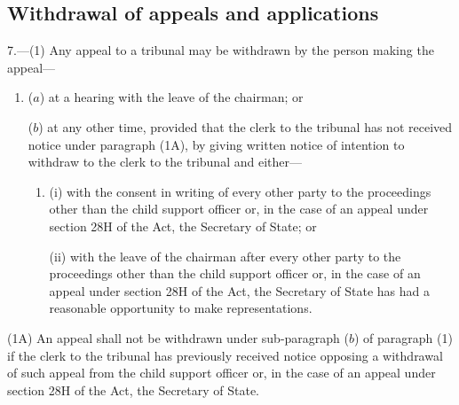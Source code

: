 \documentclass[a4paper]{article}
\begin{document}
\subsection[7. Withdrawal of appeals and applications]{Withdrawal of appeals and applications}

7.—(1) Any appeal to a tribunal may be withdrawn by the person making the appeal---
\begin{enumerate}\item[]
($a$) at a hearing with the leave of the chairman; or

%

($b$) at any other time, provided that the clerk to the tribunal has not received notice under paragraph (1A), by giving written notice of intention to withdraw to the clerk to the tribunal and either—
\begin{enumerate}\item[]
(i) with the consent in writing of every other party to the proceedings other than the child support officer
or, in the case of an appeal under section 28H of the Act, the Secretary of State; %
or

(ii) with the leave of the chairman after every other party to the proceedings other than the child support officer 
or, in the case of an appeal under section 28H of the Act, the Secretary of State %
has had a reasonable opportunity to make representations.
\end{enumerate}
\end{enumerate}

(1A) An appeal shall not be withdrawn under sub-paragraph ($b$) of paragraph (1) if the clerk to the tribunal has previously received notice opposing a withdrawal of such appeal from the child support officer
or, in the case of an appeal under section 28H of the Act,
the Secretary of State.  %
\end{document}
